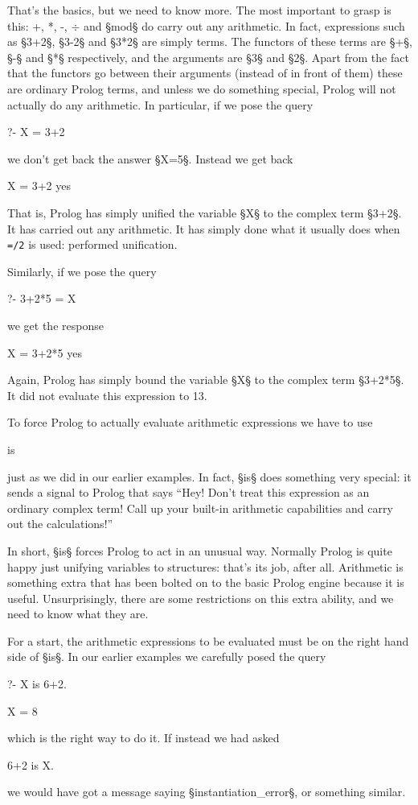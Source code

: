 That's the basics, but we need to know more.  The most important to
grasp is this: +, *, -, $\div$ and §mod§ do  carry out
any arithmetic.  In fact, expressions such as §3+2§, §3-2§ and §3*2§
are simply terms.  The functors of these terms are §+§, §-§ and §*§
respectively, and the arguments are §3§ and §2§.  Apart from the fact
that the functors go between their arguments (instead of in front of
them) these are ordinary Prolog terms, and unless we do something
special, Prolog will not actually do any arithmetic.  In
particular, if we pose the query
\begin{LPNcodedisplay}
?- X = 3+2
\end{LPNcodedisplay}
we don't get back the answer §X=5§.
Instead we get back
\begin{LPNcodedisplay}
X = 3+2
yes
\end{LPNcodedisplay}
That is, Prolog has simply unified the variable §X§ to the complex
term §3+2§.  It has  carried out any arithmetic.  It has
simply done what it usually does when \texttt{=/2} is used: performed
unification.

Similarly,
if we pose the query
\begin{LPNcodedisplay}
?- 3+2*5 = X
\end{LPNcodedisplay}
we get the response
\begin{LPNcodedisplay}
X = 3+2*5
yes
\end{LPNcodedisplay}
Again, Prolog has simply bound the variable §X§ to the complex
term §3+2*5§.  It did not evaluate this expression to 13.

To force Prolog to actually evaluate arithmetic expressions we have to
use
        \begin{LPNcodedisplay}
is
\end{LPNcodedisplay}
just as we did in our  earlier examples.  In fact, §is§ does
something very special: it sends a signal to Prolog that says ``Hey!
Don't treat this expression as an ordinary complex term!  Call up
your built-in arithmetic capabilities and carry out the calculations!''

In short, §is§ forces Prolog to act in an unusual way.  Normally
Prolog is quite happy just unifying variables to structures: that's
its job, after all.  Arithmetic is something extra that has been
bolted on to the basic Prolog engine because it is useful.
Unsurprisingly, there are some restrictions on this extra ability, and
we need to know what they are.

For a start, the arithmetic expressions to be evaluated must be on
the right hand side of §is§.  In our earlier examples we carefully
posed the query
\begin{LPNcodedisplay}
?- X is 6+2.

X = 8
\end{LPNcodedisplay}
which is the right way to do it. If instead we
had asked
\begin{LPNcodedisplay}
6+2 is X.
\end{LPNcodedisplay}
we would have got a message saying §instantiation_error§,
or something similar.

